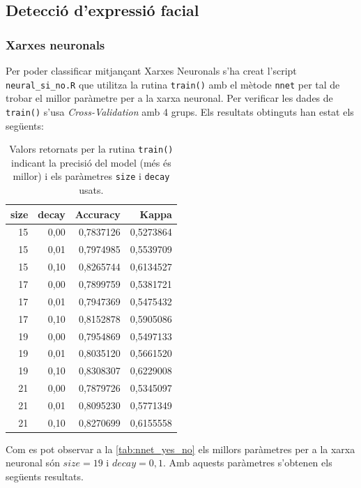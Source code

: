 \documentclass[a4paper]{article}
\begin{document}
\subsection{Detecció d'expressió facial}
\subsubsection{Xarxes neuronals}

Per poder classificar mitjançant Xarxes Neuronals s'ha creat l'script \verb|neural_si_no.R| que utilitza la rutina \verb|train()| amb el mètode \verb|nnet| per tal de trobar el millor paràmetre per a la xarxa neuronal. Per verificar les dades de \verb|train()| s'usa \emph{Cross-Validation} amb 4 grups. Els resultats obtinguts han estat els següents:

\begin{table}[H]
	\centering
	\def\arraystretch{1.2}
	\begin{tabular}{|rrrr|}
		\hline
		size & decay & Accuracy & Kappa \\
		\hline
		15 & 0,00 & 0,7837126 & 0,5273864 \\
		15 & 0,01 & 0,7974985 & 0,5539709 \\
		15 & 0,10 & 0,8265744 & 0,6134527 \\
		17 & 0,00 & 0,7899759 & 0,5381721 \\
		17 & 0,01 & 0,7947369 & 0,5475432 \\
		17 & 0,10 & 0,8152878 & 0,5905086 \\
		19 & 0,00 & 0,7954869 & 0,5497133 \\
		19 & 0,01 & 0,8035120 & 0,5661520 \\
		\rowcolor{Orange!40}
		19 & 0,10 & 0,8308307 & 0,6229008 \\
		21 & 0,00 & 0,7879726 & 0,5345097 \\
		21 & 0,01 & 0,8095230 & 0,5771349 \\
		21 & 0,10 & 0,8270699 & 0,6155558 \\
		\hline
	\end{tabular}
	\captionsetup{width=0.6\textwidth}
	\caption{Valors retornats per la rutina \texttt{train()} indicant la precisió del model (més és millor) i els paràmetres \texttt{size} i \texttt{decay} usats.}
	\label{tab:nnet_yes_no}
\end{table}

Com es pot observar a la \autoref{tab:nnet_yes_no} els millors paràmetres per a la xarxa neuronal són $size = 19$ i $decay = 0,1$. Amb aquests paràmetres s'obtenen els següents resultats.
\end{document}
